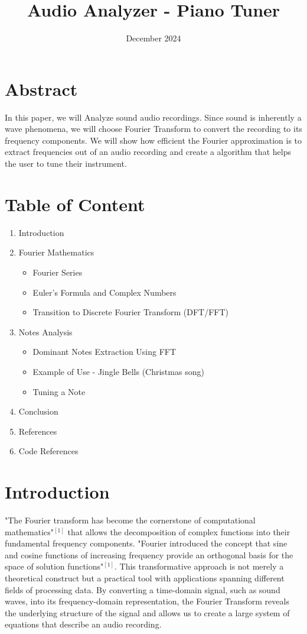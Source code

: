 \documentclass{article}
\title{Audio Analyzer - Piano Tuner}
\date{December 2024}
\begin{document}
\maketitle

\section*{Abstract}

In this paper, we will Analyze sound audio recordings. Since sound is inherently a wave phenomena, we will choose Fourier Transform to convert the recording to its frequency components. We will show how efficient the Fourier approximation is to extract frequencies out of an audio recording and create a algorithm that helps the user to tune their instrument. 

\section*{Table of Content}
\begin{enumerate}
    \item Introduction
    \item Fourier Mathematics
    \begin{itemize}
        \item Fourier Series
        \item Euler's Formula and Complex Numbers
        \item Transition to Discrete Fourier Transform (DFT/FFT)
    \end{itemize}
    \item Notes Analysis
    \begin{itemize}
        \item Dominant Notes Extraction Using FFT
        \item Example of Use - Jingle Bells (Christmas song)
        \item Tuning a Note
    \end{itemize}
    \item Conclusion
    \item References
    \item Code References
\end{enumerate}


\section*{Introduction}
"The Fourier transform has become the cornerstone of computational mathematics"$^{[1]}$ that allows the decomposition of complex functions into their fundamental frequency components. "Fourier introduced the concept that sine and cosine functions of increasing frequency provide an orthogonal basis for the space of solution functions"$^{[1]}$. This transformative approach is not merely a theoretical construct but a practical tool with applications spanning different fields of processing data. By converting a time-domain signal, such as sound waves, into its frequency-domain representation, the Fourier Transform reveals the underlying structure of the signal and allows us to create a large system of equations that describe an audio recording.
\end{document}
